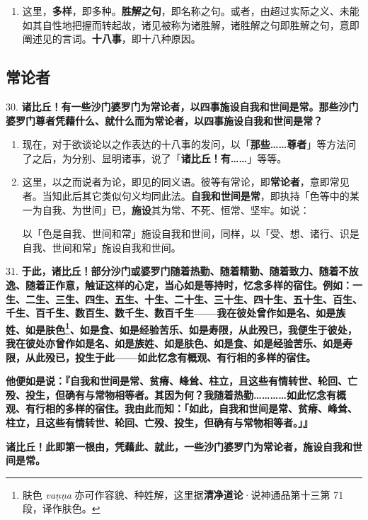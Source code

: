 \begin{enumerate}
\item 这里，\textbf{多样}，即多种。\textbf{胜解之句}，即名称之句。或者，由超过实际之义、未能如其自性地把握而转起故，诸见被称为诸胜解，诸胜解之句即胜解之句，意即阐述见的言词。\textbf{十八事}，即十八种原因。\end{enumerate}

\subsection{常论者}

{\Large 30.} \textbf{诸比丘！有一些沙门婆罗门为常论者，以四事施设自我和世间是常。那些沙门婆罗门尊者凭藉什么、就什么而为常论者，以四事施设自我和世间是常？}

\begin{enumerate}\item 现在，对于欲谈论以之作表达的十八事的发问，以「\textbf{那些……尊者}」等方法问了之后，为分别、显明诸事，说了「\textbf{诸比丘！有……}」等等。
\item 这里，以之而说者为论，即见的同义语。彼等有常论，即\textbf{常论者}，意即常见者。当知此后其它类似句义均同此法。\textbf{自我和世间是常}，即执持「色等中的某一为自我、为世间」已，\textbf{施设}其为常、不死、恒常、坚牢。如说：\begin{quoting}以「色是自我、世间和常」施设自我和世间，同样，以「受、想、诸行、识是自我、世间和常」施设自我和世间。\end{quoting}\end{enumerate}

{\Large 31.} \textbf{于此，诸比丘！部分沙门或婆罗门随着热勤、随着精勤、随着致力、随着不放逸、随着正作意，触证这样的心定，当心如是等持时，忆念多样的宿住。例如：一生、二生、三生、四生、五生、十生、二十生、三十生、四十生、五十生、百生、千生、百千生、数百生、数千生、数百千生——我在彼处曾作如是名、如是族姓、如是肤色\footnote{肤色 \textit{vaṇṇa} 亦可作容貌、种姓解，这里据\textbf{清净道论}·说神通品第十三第 71 段，译作肤色。}、如是食、如是经验苦乐、如是寿限，从此殁已，我便生于彼处，我在彼处亦曾作如是名、如是族姓、如是肤色、如是食、如是经验苦乐、如是寿限，从此殁已，投生于此——如此忆念有概观、有行相的多样的宿住。}

\textbf{他便如是说：『自我和世间是常、贫瘠、峰耸、柱立，且这些有情转世、轮回、亡殁、投生，但确有与常物相等者。其因为何？我随着热勤…………如此忆念有概观、有行相的多样的宿住。我由此而知：「如此，自我和世间是常、贫瘠、峰耸、柱立，且这些有情转世、轮回、亡殁、投生，但确有与常物相等者。」』}

\textbf{诸比丘！此即第一根由，凭藉此、就此，一些沙门婆罗门为常论者，施设自我和世间是常。}

